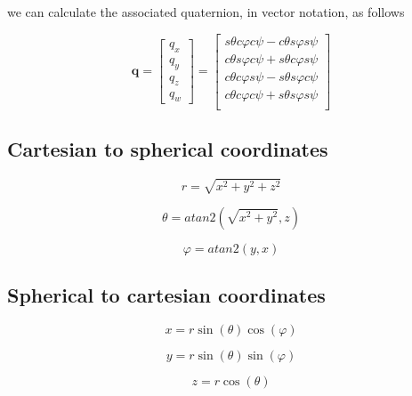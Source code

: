 we can calculate the associated quaternion, in vector notation, as follows

\[
\mathbf{q} = \begin{bmatrix} q_x \\ q_y \\ q_z \\ q_w \end{bmatrix} = \begin{bmatrix}
sθcφcψ - cθsφsψ \\
cθsφcψ + sθcφsψ \\
cθcφsψ - sθsφcψ \\
cθcφcψ + sθsφsψ \\
\end{bmatrix}
\]

\subsection{Cartesian to spherical coordinates}

\[
r = \sqrt{x^2+y^2+z^2}
\]

\[
θ = atan2(\sqrt{x^2 + y^2}, z)
\]

\[
φ = atan2(y, x)
\]


\subsection{Spherical to cartesian coordinates}

\[
x = r\sin(θ)\cos(φ)
\]

\[
y = r\sin(θ)\sin(φ)
\]

\[
z = r\cos(θ)
\]

